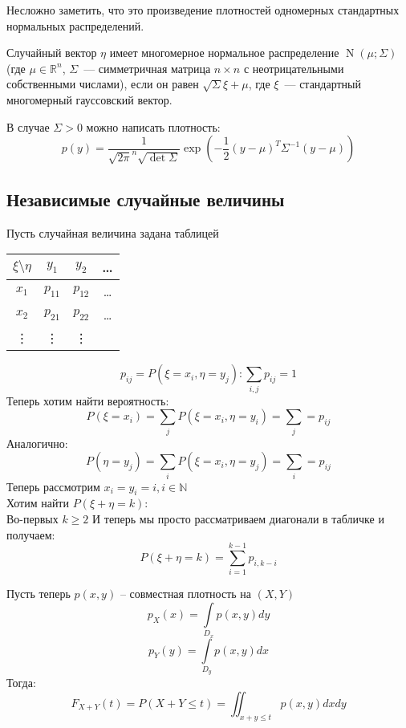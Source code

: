 \documentclass{article}
\begin{document}
    \begin{property}
        Несложно заметить, что это произведение плотностей одномерных стандартных нормальных распределений.
    \end{property}
    \begin{example}
        Случайный вектор $\eta$ имеет многомерное нормальное распределение $\operatorname{N}(\mu;\Sigma)$ (где $\mu\in\mathbb R^n$, $\Sigma$~--- симметричная матрица $n\times n$ с неотрицательными собственными числами), если он равен $\sqrt\Sigma\xi+\mu$, где $\xi$~--- стандартный многомерный гауссовский вектор.
    \end{example}
    \begin{remark}
        В случае $\Sigma>0$ можно написать плотность:
        $$
        p(y)=\frac1{\sqrt{2\pi}^n\sqrt{\det\Sigma}}\exp\left(-\frac12(y-\mu)^T\Sigma^{-1}(y-\mu)\right)
        $$
    \end{remark}

    \subsection{Независимые случайные величины}
    \begin{example}
    Пусть случайная величина задана таблицей\\
    \begin{tabular}{|c|c|c|c}
    \hline
    $\xi \text{\textbackslash} \eta$ & $y_1$ & $y_2$ & \dots \\
    \hline
    $x_1$ & $p_{11}$ & $p_{12}$ & \dots \\
    \hline
    $x_2$ & $p_{21}$ & $p_{22}$ & \dots \\
    \hline
    \vdots & \vdots & \vdots &  \\
    \end{tabular}

    $$ p_{ij} = P(\xi = x_i, \eta = y_j): \sum\limits_{i, j} p_{ij} = 1 $$
    Теперь хотим найти вероятность:
    $$ P(\xi = x_i) = \sum\limits_j P(\xi = x_i, \eta=y_i) = \sum\limits_j = p_{ij}$$
    Аналогично:
    $$ P(\eta = y_j) = \sum\limits_i P(\xi = x_i, \eta=y_j) = \sum\limits_i = p_{ij}$$
    Теперь рассмотрим $x_i = y_i = i, i \in \mathbb{N}$ \\
    Хотим найти $P(\xi + \eta = k)$: \\
    Во-первых $ k \ge 2$
    И теперь мы просто рассматриваем диагонали в табличке и получаем: 
    $$ P(\xi + \eta = k) = \sum\limits_{i=1}^{k-1} p_{i, k-i}$$

    Пусть теперь $p(x, y)$ -- совместная плотность на $(X, Y)$
     $$p_X(x) = \int\limits_{D_x} p(x, y) dy$$
     $$p_Y(y) = \int\limits_{D_y} p(x, y) dx$$
     Тогда:
    $$F_{X+Y}(t) = P(X+Y \le t) = \iint_{x+y \le t} p(x, y) dx dy$$
    \end{example}
\end{document}
